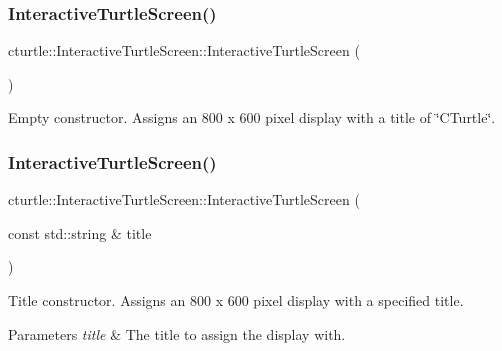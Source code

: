 \subsubsection{\texorpdfstring{Interactive\+Turtle\+Screen()}{InteractiveTurtleScreen()}\hspace{0.1cm}{\footnotesize\ttfamily [1/3]}}
{\footnotesize\ttfamily cturtle\+::\+Interactive\+Turtle\+Screen\+::\+Interactive\+Turtle\+Screen (\begin{DoxyParamCaption}{ }\end{DoxyParamCaption})\hspace{0.3cm}{\ttfamily [inline]}}

Empty constructor. Assigns an 800 x 600 pixel display with a title of \char`\"{}\+C\+Turtle\char`\"{}. \mbox{\label{classcturtle_1_1InteractiveTurtleScreen_ad65865be39cbe33c8614bb14f918058f}} 
\subsubsection{\texorpdfstring{Interactive\+Turtle\+Screen()}{InteractiveTurtleScreen()}\hspace{0.1cm}{\footnotesize\ttfamily [2/3]}}
{\footnotesize\ttfamily cturtle\+::\+Interactive\+Turtle\+Screen\+::\+Interactive\+Turtle\+Screen (\begin{DoxyParamCaption}\item[{const std\+::string \&}]{title }\end{DoxyParamCaption})\hspace{0.3cm}{\ttfamily [inline]}}

Title constructor. Assigns an 800 x 600 pixel display with a specified title. 
\begin{DoxyParams}{Parameters}
{\em title} & The title to assign the display with. \\
\hline
\end{DoxyParams}
\mbox{\label{classcturtle_1_1InteractiveTurtleScreen_af9fb0672e3b17b2c07497de0b9ef99ee}} 
